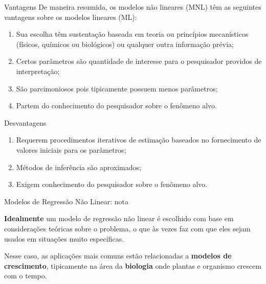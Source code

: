 \documentclass[xcolor=dvipsnames]{beamer}
\begin{document}
       \begin{frame}{Vantagens}
       De maneira resumida, os modelos não lineares (MNL) têm as seguintes vantagens sobre os modelos lineares (ML):
         \begin{enumerate}
             \item Sua escolha têm sustentação baseada em teoria ou princípios mecanísticos (físicos, químicos ou biológicos) ou qualquer outra informação prévia;
             \item Certos parâmetros são quantidade de interesse para o pesquisador providos de interpretação;
             \item São parcimoniosos pois tipicamente possuem menos parâmetros;
             \item Partem do conhecimento do pesquisador sobre o fenômeno alvo.

         \end{enumerate}
           
       \end{frame}

       \begin{frame}{Desvantagens}
          \begin{enumerate}
              \item Requerem procedimentos iterativos de estimação baseados no fornecimento de valores iniciais para os parâmetros;
              \item Métodos de inferência são aproximados;
              \item Exigem conhecimento do pesquisador sobre o fenômeno alvo.
          \end{enumerate}
           
       \end{frame}

       \begin{frame}{Modelos de Regressão Não Linear: nota}

      \textbf{Idealmente} um modelo de regressão não linear é escolhido com base em considerações teóricas sobre o problema, o que às vezes faz com que eles sejam usados em situações muito específicas.

      \vspace{0.5cm}
      Nesse caso, as aplicações mais comuns estão relacionadas a \textbf{modelos de crescimento}, tipicamente na área da \textbf{biologia} onde plantas e organismo crescem com o tempo.
           
       \end{frame}
\end{document}
